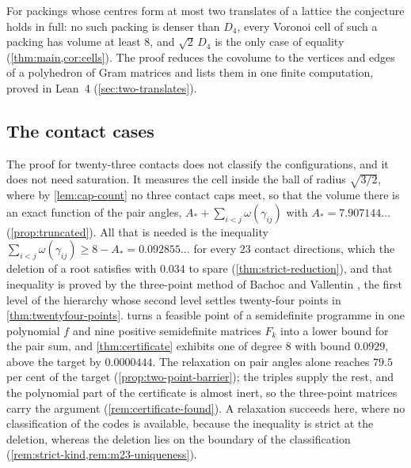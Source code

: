 \documentclass[11pt,reqno]{amsart}
\renewcommand{\_}{\origunderscore\allowbreak}
\numberwithin{equation}{section}
\theoremstyle{plain}
\theoremstyle{definition}
\theoremstyle{remark}
\begin{document}
For packings whose centres form at most two translates of a lattice the
conjecture holds in full: no such packing is denser than $D_4$, every Voronoi
cell of such a packing has volume at least $8$, and $\sqrt2\,D_4$ is the only
case of equality (\cref{thm:main,cor:cells}). The proof reduces the covolume
to the vertices and edges of a polyhedron of Gram matrices and lists them in
one finite computation, proved in Lean~4 (\cref{sec:two-translates}).

\subsection{The contact cases}

The proof for twenty-three contacts does not classify the configurations,
and it does not need saturation. It measures the cell inside the ball of
radius $\sqrt{3/2}$, where by \cref{lem:cap-count} no three contact caps
meet, so that the volume there is an exact function of the pair angles,
$A_*+\sum_{i<j}\omega(\gamma_{ij})$ with $A_*=7.907144\ldots$
(\cref{prop:truncated}). All that is needed is the inequality
$\sum_{i<j}\omega(\gamma_{ij})\ge8-A_*=0.092855\ldots$ for every $23$
contact directions, which the deletion of a root satisfies with $0.034$ to
spare (\cref{thm:strict-reduction}), and that inequality is proved by the
three-point method of Bachoc and Vallentin \cite{BV08}, the first level of
the hierarchy whose second level settles twenty-four points in
\cref{thm:twentyfour-points}.  turns a feasible point
of a semidefinite programme in one polynomial $f$ and nine positive
semidefinite matrices $F_k$ into a lower bound for the pair sum, and
\cref{thm:certificate} exhibits one of degree $8$ with bound $0.0929$, above
the target by $0.0000444$. The relaxation on pair angles alone reaches
$79.5$ per cent of the target (\cref{prop:two-point-barrier}); the triples
supply the rest, and the polynomial part of the certificate is almost
inert, so the three-point matrices carry the argument
(\cref{rem:certificate-found}). A relaxation succeeds here, where no
classification of the codes is available, because the inequality is
strict at the deletion, whereas the deletion lies on the boundary of the
classification (\cref{rem:strict-kind,rem:m23-uniqueness}).
\end{document}
